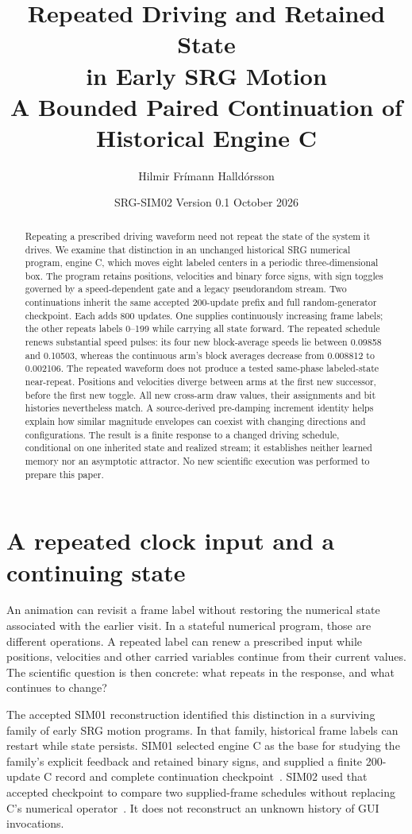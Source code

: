 \documentclass[11pt,a4paper]{article}
\title{\textbf{Repeated Driving and Retained State\\in Early SRG Motion}\\[5pt]
\large A Bounded Paired Continuation of Historical Engine C}
\author{Hilmir Fr\'imann Halld\'orsson}
\date{SRG-SIM02 \quad Version 0.1 \quad 14 October 2026}
\begin{document}
\maketitle
\begin{abstract}
Repeating a prescribed driving waveform need not repeat the state of the system it drives. We examine that distinction in an unchanged historical SRG numerical program, engine C, which moves eight labeled centers in a periodic three-dimensional box. The program retains positions, velocities and binary force signs, with sign toggles governed by a speed-dependent gate and a legacy pseudorandom stream. Two continuations inherit the same accepted 200-update prefix and full random-generator checkpoint. Each adds 800 updates. One supplies continuously increasing frame labels; the other repeats labels 0--199 while carrying all state forward. The repeated schedule renews substantial speed pulses: its four new block-average speeds lie between 0.09858 and 0.10503, whereas the continuous arm's block averages decrease from 0.008812 to 0.002106. The repeated waveform does not produce a tested same-phase labeled-state near-repeat. Positions and velocities diverge between arms at the first new successor, before the first new toggle. All new cross-arm draw values, their assignments and bit histories nevertheless match. A source-derived pre-damping increment identity helps explain how similar magnitude envelopes can coexist with changing directions and configurations. The result is a finite response to a changed driving schedule, conditional on one inherited state and realized stream; it establishes neither learned memory nor an asymptotic attractor. No new scientific execution was performed to prepare this paper.
\end{abstract}

\section{A repeated clock input and a continuing state}
\label{sec:question}
An animation can revisit a frame label without restoring the numerical state associated with the earlier visit. In a stateful numerical program, those are different operations. A repeated label can renew a prescribed input while positions, velocities and other carried variables continue from their current values. The scientific question is then concrete: what repeats in the response, and what continues to change?

The accepted SIM01 reconstruction identified this distinction in a surviving family of early SRG motion programs. In that family, historical frame labels can restart while state persists. SIM01 selected engine C as the base for studying the family's explicit feedback and retained binary signs, and supplied a finite 200-update C record and complete continuation checkpoint~\cite{sim01}. SIM02 used that accepted checkpoint to compare two supplied-frame schedules without replacing C's numerical operator~\cite{sim02}. It does not reconstruct an unknown history of GUI invocations.
\end{document}
